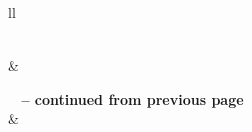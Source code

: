 \documentclass[12pt,letterpaper,dvips]{article}
\begin{document}
\begin{longtable}[l]{ll}
    \caption{FileXfer directories and files on \texttt{prod-prov4-cdr1}.}
    \label{grid_mlmmh} \\
    \hline
     &
    \\
    \hline
\endfirsthead

%
{{\bfseries \tablename\ \thetable{} -- continued from previous page}} \\
\hline
{} &
 \\ \hline 
\endhead

\hline {} \\ \hline
\endfoot

\endlastfoot


\end{longtable}
\end{document}
